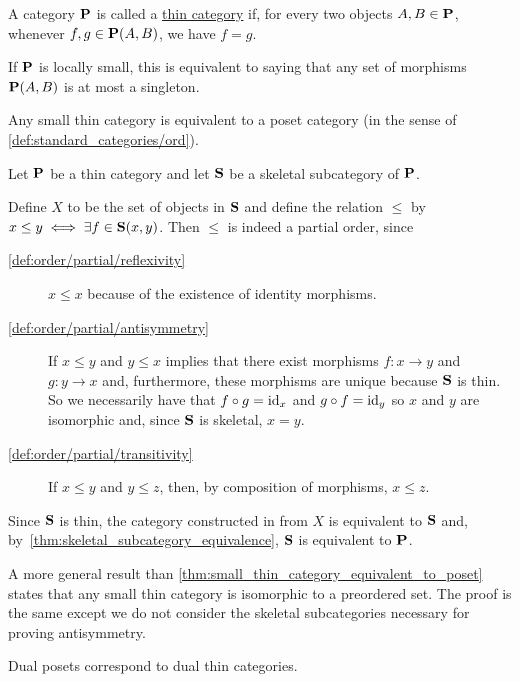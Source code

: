\begin{definition}\label{def:thin_category}\cite{nLab:thin_category}
  A category $\operatorname{\mathbf{P}}$ is called a \uline{thin category} if, for every two objects $A, B \in \operatorname{\mathbf{P}}$, whenever $f, g \in \operatorname{\mathbf{P}}(A, B)$, we have $f = g$.

  If $\operatorname{\mathbf{P}}$ is locally small, this is equivalent to saying that any set of morphisms $\operatorname{\mathbf{P}}(A, B)$ is at most a singleton.
\end{definition}

\begin{proposition}\label{thm:small_thin_category_equivalent_to_poset}
  Any small thin category is equivalent to a poset category (in the sense of \cref{def:standard_categories/ord}).
\end{proposition}
\begin{definition}
  Let $\operatorname{\mathbf{P}}$ be a thin category and let $\operatorname{\mathbf{S}}$ be a skeletal subcategory of $\operatorname{\mathbf{P}}$.

  Define $X$ to be the set of objects in $\operatorname{\mathbf{S}}$ and define the relation $\leq$ by $x \leq y \iff \exists f \in \operatorname{\mathbf{S}}(x, y)$. Then $\leq$ is indeed a partial order, since
  \begin{description}
    \item[\ref{def:order/partial/reflexivity}] $x \leq x$ because of the existence of identity morphisms.
    \item[\ref{def:order/partial/antisymmetry}] If $x \leq y$ and $y \leq x$ implies that there exist morphisms $f: x \to y$ and $g: y \to x$ and, furthermore, these morphisms are unique because $\operatorname{\mathbf{S}}$ is thin. So we necessarily have that $f \circ g = \operatorname{id}_x$ and $g \circ f = \operatorname{id}_y$ so $x$ and $y$ are isomorphic and, since $\operatorname{\mathbf{S}}$ is skeletal, $x = y$.
    \item[\ref{def:order/partial/transitivity}] If $x \leq y$ and $y \leq z$, then, by composition of morphisms, $x \leq z$.
  \end{description}

  Since $\operatorname{\mathbf{S}}$ is thin, the category constructed in from $X$ is equivalent to $\operatorname{\mathbf{S}}$ and, by~\cref{thm:skeletal_subcategory_equivalence}, $\operatorname{\mathbf{S}}$ is equivalent to $\operatorname{\mathbf{P}}$.
\end{definition}

\begin{note}\label{note:small_thin_category_isomorphic_to_preorder}
  A more general result than \cref{thm:small_thin_category_equivalent_to_poset} states that any small thin category is isomorphic to a preordered set. The proof is the same except we do not consider the skeletal subcategories necessary for proving antisymmetry.
\end{note}

\begin{proposition}\label{thm:dual_poset_dual_thin_category}
  Dual posets correspond to dual thin categories.
\end{proposition}
